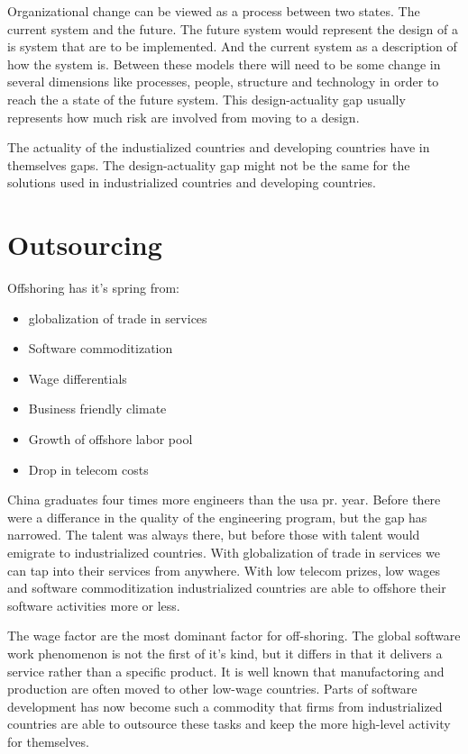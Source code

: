 Organizational change can be viewed as a process between two states.
The current system and the future.
The future system would represent the design of a \gls{is} system that are to be implemented.
And the current system as a description of how the system is.
Between these models there will need to be some change in several dimensions like processes, people, structure and technology in order to reach the a state of the future system. This design-actuality gap usually represents how much risk are involved from moving to a design. 

The actuality of the industialized countries and developing countries have in themselves gaps.
The design-actuality gap might not be the same for the solutions used in industrialized countries and developing countries. 

\cite{rh:isdc}
\cite{ca:isdc}







\section{Outsourcing}
Offshoring has it's spring from:

\begin{itemize}
\item globalization of trade in services
\item Software commoditization
\item Wage differentials
\item Business friendly climate 
\item Growth of offshore labor pool
\item Drop in telecom costs
\end{itemize}

China graduates four times more engineers than the \gls{usa} pr. year. 
Before there were a differance in the quality of the engineering program, but the gap has narrowed. 
The talent was always there, but before those with talent would emigrate to industrialized countries. 
With globalization of trade in services we can tap into their services from anywhere. 
With low telecom prizes, low wages and software commoditization industrialized countries are able to offshore their software activities more or less. 

The wage factor are the most dominant factor for off-shoring.
The global software work phenomenon is not the first of it's kind, but it differs in that it delivers a service rather than a specific product. 
It is well known that manufactoring and production are often moved to other low-wage countries.
Parts of software development has now become such a commodity that firms from industrialized countries are able to outsource these tasks and keep the more high-level activity for themselves. 

